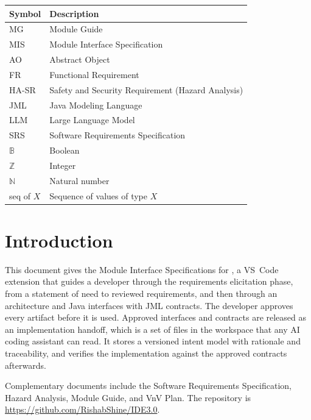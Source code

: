 \documentclass[12pt, titlepage]{article}
\begin{document}
\begin{center}
\begin{tabular}{l p{10cm}}
\toprule
\textbf{Symbol} & \textbf{Description}\\
\midrule
MG & Module Guide\\
MIS & Module Interface Specification\\
AO & Abstract Object\\
FR & Functional Requirement\\
HA-SR & Safety and Security Requirement (Hazard Analysis)\\
JML & Java Modeling Language\\
LLM & Large Language Model\\
SRS & Software Requirements Specification\\
$\mathbb{B}$ & Boolean\\
$\mathbb{Z}$ & Integer\\
$\mathbb{N}$ & Natural number\\
seq of $X$ & Sequence of values of type $X$\\
\bottomrule
\end{tabular}
\end{center}

\newpage

\tableofcontents

\newpage


\section{Introduction}

This document gives the Module Interface Specifications for \progname{}, a
VS~Code extension that guides a developer through the requirements elicitation
phase, from a statement of need to reviewed requirements, and then through an
architecture and Java interfaces with JML contracts. The developer approves
every artifact before it is used. Approved interfaces and contracts are released
as an implementation handoff, which is a set of files in the workspace that any
AI coding assistant can read. It stores a versioned intent model with rationale and traceability,
and verifies the implementation against the approved contracts afterwards.

Complementary documents include the Software Requirements Specification, Hazard
Analysis, Module Guide, and VnV Plan. The repository is
\url{https://github.com/RishabShine/IDE3.0}.
\end{document}
